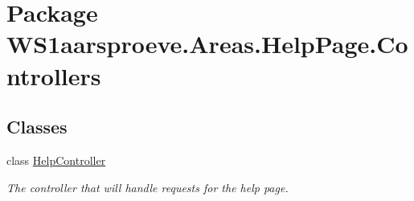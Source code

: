 \hypertarget{namespace_w_s1aarsproeve_1_1_areas_1_1_help_page_1_1_controllers}{}\section{Package W\+S1aarsproeve.\+Areas.\+Help\+Page.\+Controllers}
\label{namespace_w_s1aarsproeve_1_1_areas_1_1_help_page_1_1_controllers}
\subsection*{Classes}
\begin{DoxyCompactItemize}
\item 
class \hyperlink{class_w_s1aarsproeve_1_1_areas_1_1_help_page_1_1_controllers_1_1_help_controller}{Help\+Controller}
\begin{DoxyCompactList}\small\item\em The controller that will handle requests for the help page. \end{DoxyCompactList}\end{DoxyCompactItemize}
